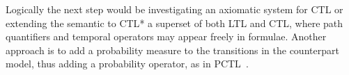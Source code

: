 Logically the next step would be investigating an axiomatic system for \ac{CTL} or extending the semantic to \ac{CTL}* a
superset of both \ac{LTL} and \ac{CTL}, where path quantifiers and temporal operators may appear freely in formulae.
Another approach is to add a probability measure to the transitions in the
counterpart model, thus adding a probability operator, as in \ac{PCTL}~\cite{brazdil_satisfiability_2008}.
